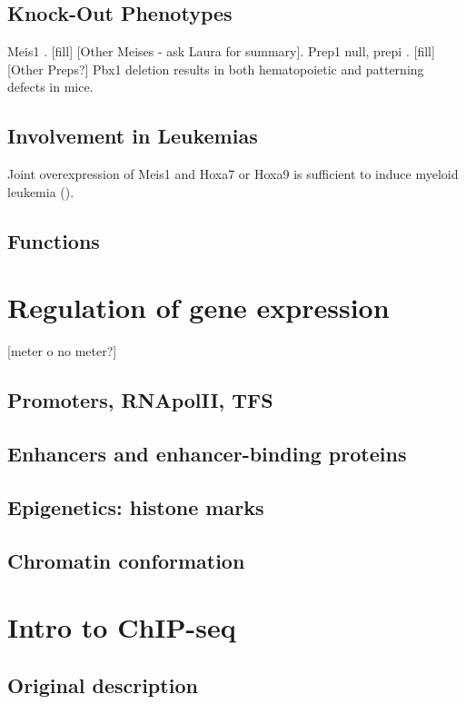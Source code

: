 \subsection{Knock-Out Phenotypes}

		Meis1  \cite{Azcoitia2005, Carramolino2010}. [fill] [Other Meises - ask Laura for summary]. 
		Prep1 null, \ac{prepi} \cite{Ferretti2006, Fernandez-Diaz2010, Longobardi2010}. [fill] [Other Preps?]
		Pbx1 deletion results in both hematopoietic \cite{DiMartino2001} and patterning \cite{Selleri et al. 2001} defects in mice.
		
\subsection{Involvement in Leukemias}
Joint overexpression of Meis1 and Hoxa7 or Hoxa9 is sufficient to induce myeloid leukemia (\cite{Nakamura1996}).

\subsection{Functions}

\section{Regulation of gene expression}
[meter o no meter?]
\subsection{Promoters, RNApolII, TFS}

\subsection{Enhancers and enhancer-binding proteins}

\subsection{Epigenetics: histone marks}

\subsection{Chromatin conformation}

\section{Intro to ChIP-seq}

\subsection{Original description}

